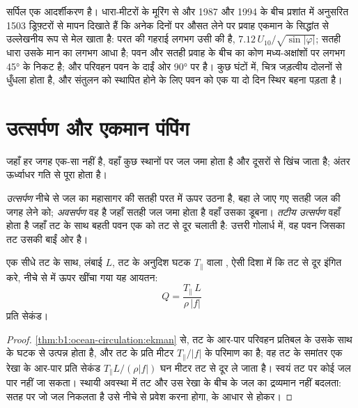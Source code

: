 सर्पिल एक आदर्शीकरण है। धारा-मीटरों के मूरिंग से और 1987 और 1994 के बीच प्रशांत में अनुसरित 1503 ड्रिफ़्टरों से मापन दिखाते हैं कि अनेक दिनों पर औसत लेने पर प्रवाह एकमान के सिद्धांत से उल्लेखनीय रूप से मेल खाता है: परत की गहराई लगभग उसी की है, $7.12\,U_{10}/\sqrt{\sin|\varphi|}$; सतही धारा उसके मान का लगभग आधा है; पवन और सतही प्रवाह के बीच का कोण मध्य-अक्षांशों पर लगभग \ang{45} के निकट है; और परिवहन पवन के दाईं ओर \ang{90} पर है। कुछ घंटों में, चित्र जड़त्वीय दोलनों से धुँधला होता है, और संतुलन को स्थापित होने के लिए पवन को एक या दो दिन स्थिर बहना पड़ता है।

\section{उत्सर्पण और एकमान पंपिंग}\label{sec:b1:ocean-circulation:upwelling}

जहाँ  हर जगह एक-सा नहीं है, वहाँ कुछ स्थानों पर जल जमा होता है और दूसरों से खिंच जाता है; अंतर ऊर्ध्वाधर गति से पूरा होता है।

\begin{definition}[उत्सर्पण, अवसर्पण, तटीय उत्सर्पण]\label{def:b1:ocean-circulation:upwelling}
\emph{उत्सर्पण} नीचे से जल का महासागर की सतही परत में ऊपर उठना है, बहा ले जाए गए सतही जल की जगह लेने को; \emph{अवसर्पण} वह है जहाँ सतही जल जमा होता है वहाँ उसका डूबना। \emph{तटीय उत्सर्पण} वहाँ होता है जहाँ तट के साथ बहती पवन एक  को तट से दूर चलाती है: उत्तरी गोलार्ध में, वह पवन जिसका तट उसकी बाईं ओर है।
\end{definition}

\begin{proposition}[तटीय उत्सर्पण]\label{prop:b1:ocean-circulation:coastal}
एक सीधे तट के साथ, लंबाई $L$, तट के अनुदिश घटक $T_\parallel$ वाला , ऐसी दिशा में कि  तट से दूर इंगित करे,
नीचे से  में ऊपर खींचा गया यह आयतन:
\[
  Q = \frac{T_\parallel\,L}{\rho\,|f|}
\]
प्रति सेकंड।
\end{proposition}

\begin{proof}
\cref{thm:b1:ocean-circulation:ekman} से, तट के आर-पार परिवहन प्रतिबल के उसके साथ के घटक से उत्पन्न होता है, और तट के प्रति मीटर $T_\parallel/|f|$ के परिमाण का है; वह तट के समांतर एक रेखा के आर-पार प्रति सेकंड $T_\parallel L/(\rho|f|)$ घन मीटर तट से दूर ले जाता है। स्वयं तट पर कोई जल पार नहीं जा सकता। स्थायी अवस्था में तट और उस रेखा के बीच के जल का द्रव्यमान नहीं बदलता: सतह पर जो जल निकलता है उसे नीचे से प्रवेश करना होगा,  के आधार से होकर।
\end{proof}

